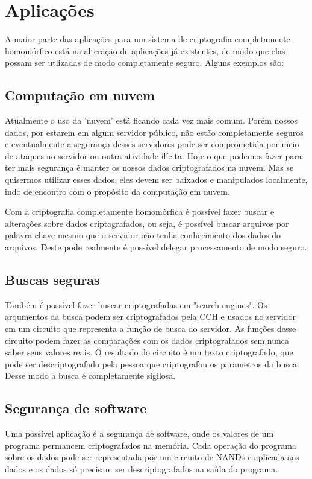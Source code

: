 \chapter{Aplicações}
\label{desenvolvimento}
A maior parte das aplicações para um sistema de criptografia completamente homomórfico está na alteração de aplicações já existentes, de modo que elas possam ser utlizadas de modo completamente seguro. Alguns exemplos são:

\section{Computação em nuvem}
Atualmente o uso da 'nuvem' está ficando cada vez mais comum. Porém nossos dados, por estarem em algum servidor público, não estão completamente seguros e eventualmente a segurança desses servidores pode ser comprometida por meio de ataques ao servidor ou outra atividade ilícita.
Hoje o que podemos fazer para ter mais segurança é manter os nossos dados criptografados na nuvem. Mas se quisermos utilizar esses dados, eles devem ser baixados e manipulados localmente, indo de encontro com o propósito da computação em nuvem.
	
Com a criptografia completamente homomórfica é possível fazer buscar e alterações sobre dados criptografados, ou seja, é possível buscar arquivos por palavra-chave mesmo que o servidor não tenha conhecimento dos dados do arquivos. Deste pode realmente é possível delegar processamento de modo seguro.
	
\section{Buscas seguras}
Também é possível fazer buscar criptografadas em "search-engines". Os arqumentos da busca podem ser criptografados pela CCH e usados no servidor em um circuito que representa a função de busca do servidor. As funções desse circuito podem fazer as comparações com os dados criptografados sem nunca saber seus valores reais.
O resultado do circuito é um texto criptografado, que pode ser descriptografado pela pessoa que criptografou os parametros da busca. Desse modo a busca é completamente sigilosa.
	
\section{Segurança de software}
Uma possível aplicação é a segurança de software, onde os valores de um programa permancem criptografados na memória. Cada operação do programa sobre os dados pode ser representada por um circuito de NANDs e aplicada aos dados e os dados só precisam ser descriptografados na saída do programa.
	
